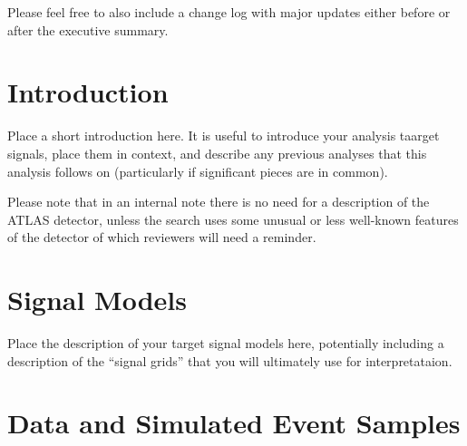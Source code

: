 \documentclass[NOTE, atlasdraft=true, texlive=2016, USenglish]{\ATLASLATEXPATH atlasdoc}
\author{ATLAS SUSY Group}
\begin{document}
\maketitle

\tableofcontents



Please feel free to also include a change log with major updates either before or after the executive summary.

\section{Introduction}
\label{sec:introduction}

Place a short introduction here.  It is useful to introduce your analysis taarget signals, place them in context, and describe any previous analyses that this analysis follows on (particularly if significant pieces are in common).

Please note that in an internal note there is no need for a description of the ATLAS detector, unless the search uses some unusual or less well-known features of the detector of which reviewers will need a reminder.

\section{Signal Models}
\label{sec:signals}

Place the description of your target signal models here, potentially including a description of the ``signal grids'' that you will ultimately use for interpretataion.

\section{Data and Simulated Event Samples}
\label{sec:samples}
\end{document}
